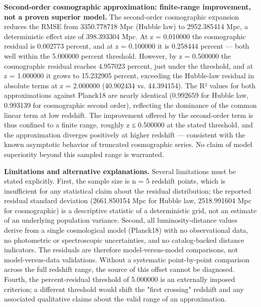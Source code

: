 \documentclass[11pt,a4paper]{article}
\begin{document}
\textbf{Second-order cosmographic approximation: finite-range improvement, not a proven superior model.} The second-order cosmographic expansion reduces the RMSE from 3350.778718 Mpc (Hubble law) to 2952.385414 Mpc, a deterministic effect size of 398.393304 Mpc. At z = 0.010000 the cosmographic residual is 0.002773 percent, and at z = 0.100000 it is 0.258444 percent — both well within the 5.000000 percent threshold. However, by z = 0.500000 the cosmographic residual reaches 4.957023 percent, just under the threshold, and at z = 1.000000 it grows to 15.232905 percent, exceeding the Hubble-law residual in absolute terms at z = 2.000000 (40.902434 vs. 44.394154). The R² values for both approximations against Planck18 are nearly identical (0.992659 for Hubble law, 0.993139 for cosmographic second order), reflecting the dominance of the common linear term at low redshift. The improvement offered by the second-order term is thus confined to a finite range, roughly z ≤ 0.500000 at the stated threshold, and the approximation diverges positively at higher redshift — consistent with the known asymptotic behavior of truncated cosmographic series. No claim of model superiority beyond this sampled range is warranted.

\textbf{Limitations and alternative explanations.} Several limitations must be stated explicitly. First, the sample size is n = 5 redshift points, which is insufficient for any statistical claim about the residual distribution; the reported residual standard deviation (2661.850154 Mpc for Hubble law, 2518.991604 Mpc for cosmographic) is a descriptive statistic of a deterministic grid, not an estimate of an underlying population variance. Second, all luminosity-distance values derive from a single cosmological model (Planck18) with no observational data, no photometric or spectroscopic uncertainties, and no catalog-backed distance indicators. The residuals are therefore model-versus-model comparisons, not model-versus-data validations. Without a systematic point-by-point comparison across the full redshift range, the source of this offset cannot be diagnosed. Fourth, the percent-residual threshold of 5.000000 is an externally imposed criterion; a different threshold would shift the "first crossing" redshift and any associated qualitative claims about the valid range of an approximation.
\end{document}
